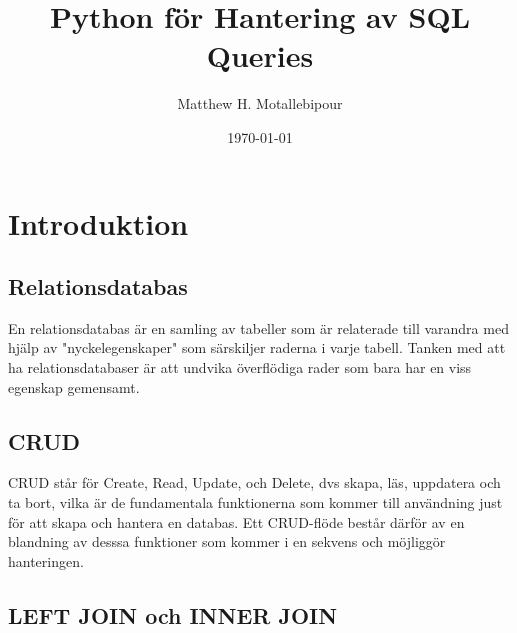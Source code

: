 \documentclass[]{article}
\begin{document}

\title{Python för Hantering av SQL Queries}
\author{Matthew H. Motallebipour}
\date{\today}
\maketitle

\section{Introduktion}


\subsection{Relationsdatabas}

En relationsdatabas är en samling av tabeller som är relaterade till varandra med hjälp av "nyckelegenskaper" som särskiljer raderna i varje tabell. Tanken med att ha relationsdatabaser är att undvika överflödiga rader som bara har en viss egenskap gemensamt.


\subsection{CRUD}

CRUD står för Create, Read, Update, och Delete, dvs skapa, läs, uppdatera och ta bort, vilka är de fundamentala funktionerna som kommer till användning just för att skapa och hantera en databas. Ett CRUD-flöde består därför av en blandning av desssa funktioner som kommer i en sekvens och möjliggör hanteringen.



\subsection{LEFT JOIN och INNER JOIN}
\end{document}
